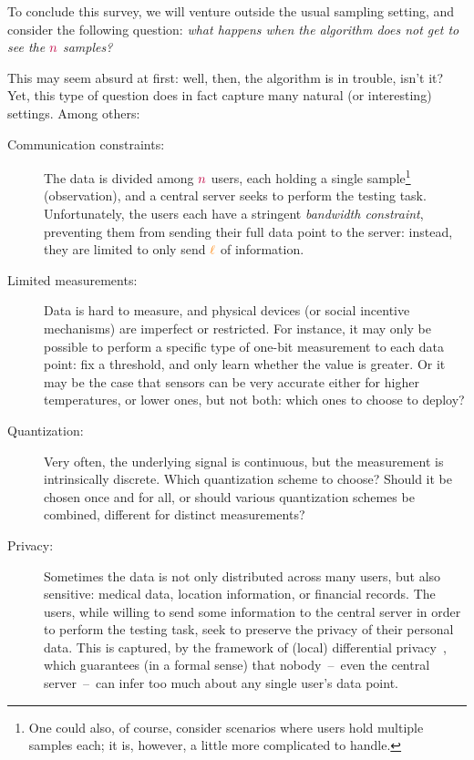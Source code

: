 
To conclude this survey, we will venture outside the usual sampling setting, and consider the following question: \emph{what happens when the algorithm does not get to see the ${\textcolor{purple}{n}}$ \iid samples?}

This may seem absurd at first: well, then, the algorithm is in trouble, isn't it? Yet, this type of question does in fact capture many natural (or interesting) settings. Among others:
\begin{description}
	\item[Communication constraints:] The data is divided among ${\textcolor{purple}{n}}$ users, each holding a single sample\footnote{One could also, of course, consider scenarios where users hold multiple samples each; it is, however, a little more complicated to handle.} (observation), and a central server seeks to perform the testing task. Unfortunately, the users each have a stringent \emph{bandwidth constraint}, preventing them from sending their full data point to the server: instead, they are limited to only send ${\textcolor{orange}{\ell}}$ of information.
	\item[Limited measurements:] Data is hard to measure, and physical devices (or social incentive mechanisms) are imperfect or restricted. For instance, it may only be possible to perform a specific type of one-bit measurement to each data point: fix a threshold, and only learn whether the value is greater. Or it may be the case that sensors can be very accurate either for higher temperatures, or lower ones, but not both: which ones to choose to deploy?
	\item[Quantization:] Very often, the underlying signal is continuous, but the measurement is intrinsically discrete. Which quantization scheme to choose? Should it be chosen once and for all, or should various quantization schemes be combined, different for distinct measurements?
	\item[Privacy:] Sometimes the data is not only distributed across many users, but also sensitive: \eg medical data, location information, or financial records. The users, while willing to send some information to the central server in order to perform the testing task, seek to preserve the privacy of their personal data. This is captured, \eg by the framework of (local) differential privacy~\citep{DworkMNS06,KLNRS:11,DJW:13:FOCS}, which guarantees (in a formal sense) that nobody~--~even the central server~--~can infer too much about any single user's data point.

\end{description}
